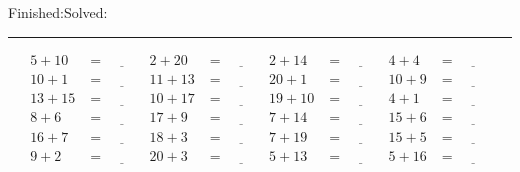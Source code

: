 \documentclass{article}
\begin{document}
\begin{sloppy}
\begin{center}
{\selectfont {Started:}\underline{\hspace{1.5cm}}{Finished:}\underline{\hspace{1.5cm}}{Solved:}\underline{\hspace{1.5cm}}}
\end{center}
\hrule
\begin{align*}
    {5} + {10} &= \underline{\hspace{1cm}} & {2} + {20} &= \underline{\hspace{1cm}} & {2} + {14} &= \underline{\hspace{1cm}} & {4} + {4} &= \underline{\hspace{1cm}} \\
    {10} + {1} &= \underline{\hspace{1cm}} & {11} + {13} &= \underline{\hspace{1cm}} & {20} + {1} &= \underline{\hspace{1cm}} & {10} + {9} &= \underline{\hspace{1cm}} \\
    {13} + {15} &= \underline{\hspace{1cm}} & {10} + {17} &= \underline{\hspace{1cm}} & {19} + {10} &= \underline{\hspace{1cm}} & {4} + {1} &= \underline{\hspace{1cm}} \\
    {8} + {6} &= \underline{\hspace{1cm}} & {17} + {9} &= \underline{\hspace{1cm}} & {7} + {14} &= \underline{\hspace{1cm}} & {15} + {6} &= \underline{\hspace{1cm}} \\
    {16} + {7} &= \underline{\hspace{1cm}} & {18} + {3} &= \underline{\hspace{1cm}} & {7} + {19} &= \underline{\hspace{1cm}} & {15} + {5} &= \underline{\hspace{1cm}} \\
    {9} + {2} &= \underline{\hspace{1cm}} & {20} + {3} &= \underline{\hspace{1cm}} & {5} + {13} &= \underline{\hspace{1cm}} & {5} + {16} &= \underline{\hspace{1cm}} \\

\end{align*}
\end{sloppy}
\end{document}
